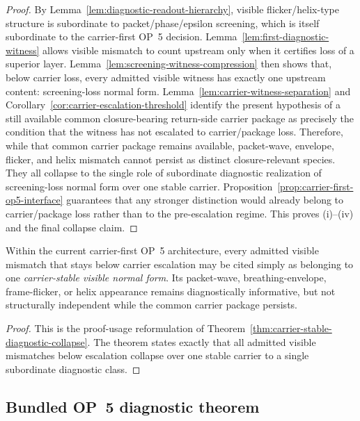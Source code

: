 \begin{proof}
By Lemma~\ref{lem:diagnostic-readout-hierarchy}, visible flicker/helix-type structure is subordinate to packet/phase/epsilon screening, which is itself subordinate to the carrier-first OP~5 decision. Lemma~\ref{lem:first-diagnostic-witness} allows visible mismatch to count upstream only when it certifies loss of a superior layer. Lemma~\ref{lem:screening-witness-compression} then shows that, below carrier loss, every admitted visible witness has exactly one upstream content: screening-loss normal form. Lemma~\ref{lem:carrier-witness-separation} and Corollary~\ref{cor:carrier-escalation-threshold} identify the present hypothesis of a still available common closure-bearing return-side carrier package as precisely the condition that the witness has not escalated to carrier/package loss. Therefore, while that common carrier package remains available, packet-wave, envelope, flicker, and helix mismatch cannot persist as distinct closure-relevant species. They all collapse to the single role of subordinate diagnostic realization of screening-loss normal form over one stable carrier. Proposition~\ref{prop:carrier-first-op5-interface} guarantees that any stronger distinction would already belong to carrier/package loss rather than to the pre-escalation regime. This proves (i)--(iv) and the final collapse claim.
\end{proof}

\begin{corollary}
\label{cor:carrier-stable-visible-normal-form}
Within the current carrier-first OP~5 architecture, every admitted visible mismatch that stays below carrier escalation may be cited simply as belonging to one \emph{carrier-stable visible normal form}. Its packet-wave, breathing-envelope, frame-flicker, or helix appearance remains diagnostically informative, but not structurally independent while the common carrier package persists.
\end{corollary}

\begin{proof}
This is the proof-usage reformulation of Theorem~\ref{thm:carrier-stable-diagnostic-collapse}. The theorem states exactly that all admitted visible mismatches below escalation collapse over one stable carrier to a single subordinate diagnostic class.
\end{proof}


\subsection{Bundled OP~5 diagnostic theorem}
\label{sec:bundled-op5-diagnostic-theorem}

